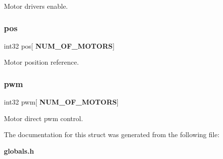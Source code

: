 Motor drivers enable. \mbox{\label{structst__ref_a4ac6e991f146f79c274e21a17cfff0a0}} 
\subsubsection{pos}
{\footnotesize\ttfamily int32 pos[\textbf{ N\+U\+M\+\_\+\+O\+F\+\_\+\+M\+O\+T\+O\+RS}]}

Motor position reference. \mbox{\label{structst__ref_ab49c38a5e5d5e68212e6d4f6c79167bd}} 
\subsubsection{pwm}
{\footnotesize\ttfamily int32 pwm[\textbf{ N\+U\+M\+\_\+\+O\+F\+\_\+\+M\+O\+T\+O\+RS}]}

Motor direct pwm control. 

The documentation for this struct was generated from the following file\+:\begin{DoxyCompactItemize}
\item 
\textbf{ globals.\+h}\end{DoxyCompactItemize}

